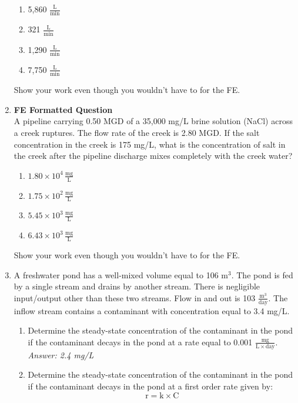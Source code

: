 \documentclass[12pt,letterpaper]{article}
\begin{document}
\begin{enumerate}
\begin{enumerate}
\item 5,860 $\mathrm{\frac{L}{min}}$
\item 321 $\mathrm{\frac{L}{min}}$
\item 1,290 $\mathrm{\frac{L}{min}}$
\item 7,750 $\mathrm{\frac{L}{min}}$
\end{enumerate}
Show your work even though you wouldn't have to for the FE.


\item \textbf{FE Formatted Question}\\
A pipeline carrying 0.50 MGD of a 35,000 mg/L brine solution (NaCl) across a creek ruptures.  The flow rate of the creek is 2.80 MGD.  If the salt concentration in the creek is 175 mg/L, what is the concentration of salt in the creek after the pipeline discharge mixes completely with the creek water?

\begin{enumerate}
\item $\mathrm{1.80\times 10^4\, \frac{mg}{L}}$
\item $\mathrm{1.75\times 10^2\, \frac{mg}{L}}$
\item $\mathrm{5.45\times 10^3\, \frac{mg}{L}}$
\item $\mathrm{6.43\times 10^3\, \frac{mg}{L}}$
\end{enumerate}
Show your work even though you wouldn't have to for the FE.


\item A freshwater pond has a well-mixed volume equal to 106 $\mathrm{m^3}$.   The pond is fed by a single stream and drains by another stream.  There is negligible input/output other than these two streams.  Flow in and out is 103 $\mathrm{\frac{m^3}{day}}$.  The inflow stream contains a contaminant with concentration equal to 3.4 mg/L. 

\begin{enumerate}
\item Determine the steady-state concentration of the contaminant in the pond if the contaminant decays in the pond at a rate equal to 0.001 $\mathrm{\frac{mg}{L\times day}}$.\\
\emph{Answer: 2.4 mg/L}
 
\item Determine the steady-state concentration of the contaminant in the pond if the contaminant decays in the pond at a first order rate given by:
\begin{equation*}
\mathrm{r = k\times C}
\end{equation*} 


\end{enumerate}
\end{enumerate}
\end{document}
